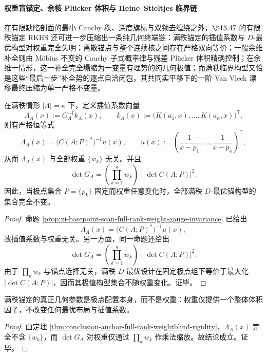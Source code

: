 \paragraph{权重盲锚定、余核 Plücker 体积与 Heine--Stieltjes 临界链}
在有限缺陷剖面的最小 Cauchy 秩、深度旗标与双频去缠绕之外，\(\S 13.47\) 的有限秩锚定 RKHS 还可进一步压缩出一条纯几何终端链：满秩锚定的插值系数与 \(D\)-最优构型对权重完全失明；离散锚点与整个连续核之间存在严格双向等价；一般余维补全则由 Möbius 不变的 Cauchy 子式概率律与残差 Plücker 体积精确控制；在余维一情形，这一补全完全塌缩为一变量有理势的纯几何极值；而满秩临界构型又恰是这些“最后一步”补全势的逐点自洽闭包，其共同实平移下的一阶 Van Vleck 漂移最终压缩为单一严格不变量。

\begin{theorem}[满秩锚定的权重盲刚性]\label{thm:conclusion-anchor-full-rank-weightblind-rigidity}
在满秩情形 \(|A|=\kappa\) 下，定义插值系数向量
\[
\Lambda_A(x):=G_A^{-1}k_A(x),
\qquad
k_A(x):=\bigl(K(a_1,x),\dots,K(a_\kappa,x)\bigr)^{\mathsf T}.
\]
则有严格恒等式
\[
\Lambda_A(x)=\bigl(C(A;P)^\ast\bigr)^{-1}u(x),
\qquad
u(x):=\left(\frac{1}{x-p_1},\dots,\frac{1}{x-p_\kappa}\right)^{\mathsf T},
\]
从而 \(\Lambda_A(x)\) 与全部权重 \(\{w_k\}\) 无关。并且
\[
\det G_A
=
\left(\prod_{k=1}^{\kappa}w_k\right)\cdot |\det C(A;P)|^2.
\]
因此，当极点集合 \(P=\{p_k\}\) 固定而权重任意变化时，全部满秩 \(D\)-最优锚构型的集合完全不变。
\end{theorem}
\begin{proof}
命题 \ref{prop:xi-basepoint-scan-full-rank-weight-gauge-invariance} 已给出
\[
\Lambda_A(x)=\bigl(C(A;P)^\ast\bigr)^{-1}u(x),
\]
故插值系数与权重无关。另一方面，同一命题还给出
\[
\det G_A
=
\left(\prod_{k=1}^{\kappa}w_k\right)\cdot |\det C(A;P)|^2.
\]
由于 \(\prod_k w_k\) 与锚点选择无关，满秩 \(D\)-最优设计在固定极点组下等价于最大化 \(|\det C(A;P)|\)，因而其极值构型集合不随权重变化。证毕。
\end{proof}

\begin{corollary}[满秩锚定几何的极点主导性]\label{cor:conclusion-anchor-full-rank-pole-dominance}
满秩锚定的真正几何参数是极点配置本身，而不是权重：权重仅提供一个整体体积因子，不改变任何最优布局与插值系数。
\end{corollary}
\begin{proof}
由定理 \ref{thm:conclusion-anchor-full-rank-weightblind-rigidity}，\(\Lambda_A(x)\) 完全不含 \(\{w_k\}\)，而 \(\det G_A\) 对权重仅通过 \(\prod_k w_k\) 作乘法缩放。故结论成立。证毕。
\end{proof}

